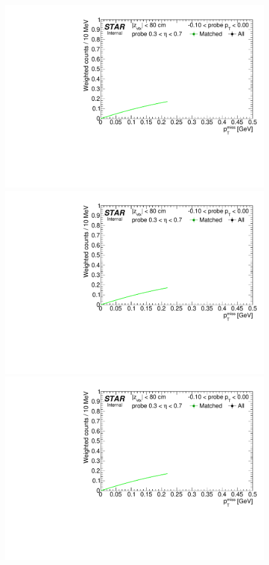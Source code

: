 \begin{figure}[ht]
{}~~~~
\parbox{0.24\textwidth}{ 
  \centering
  \includegraphics[width=\linewidth,page=6]{graphics/correctionsToEff/TOF_tagAndProbe/Fitting_effVsPt_data_ETABINS_A.CPT2.pdf}\\
  \includegraphics[width=\linewidth,page=8]{graphics/correctionsToEff/TOF_tagAndProbe/Fitting_effVsPt_data_ETABINS_A.CPT2.pdf}\\
  \includegraphics[width=\linewidth,page=10]{graphics/correctionsToEff/TOF_tagAndProbe/Fitting_effVsPt_data_ETABINS_A.CPT2.pdf}\\[84pt]

}
\end{figure}
